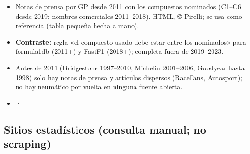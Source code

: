 \begin{itemize}
\item Notas de prensa por GP desde 2011 con los compuestos nominados (C1–C6 desde 2019; nombres comerciales 2011–2018). HTML, © Pirelli; se usa como referencia (tabla pequeña hecha a mano).
\item \textbf{Contraste:} regla «el compuesto usado debe estar entre los nominados» para formula1db (2011+) y FastF1 (2018+); completa  fuera de 2019–2023.
\item Antes de 2011 (Bridgestone 1997–2010, Michelin 2001–2006, Goodyear hasta 1998) solo hay notas de prensa y artículos dispersos (RaceFans, Autosport); no hay neumático por vuelta en ninguna fuente abierta.
\item \href{https://press.pirelli.com/?h=1&t=2024+Tyre+Compound+Choices}{} · \href{https://www.racefans.net/2009/02/26/tyre-compounds-for-first-five-races-of-2009/}{}
\end{itemize}

\subsection{Sitios estadísticos (consulta manual; no scraping)}


